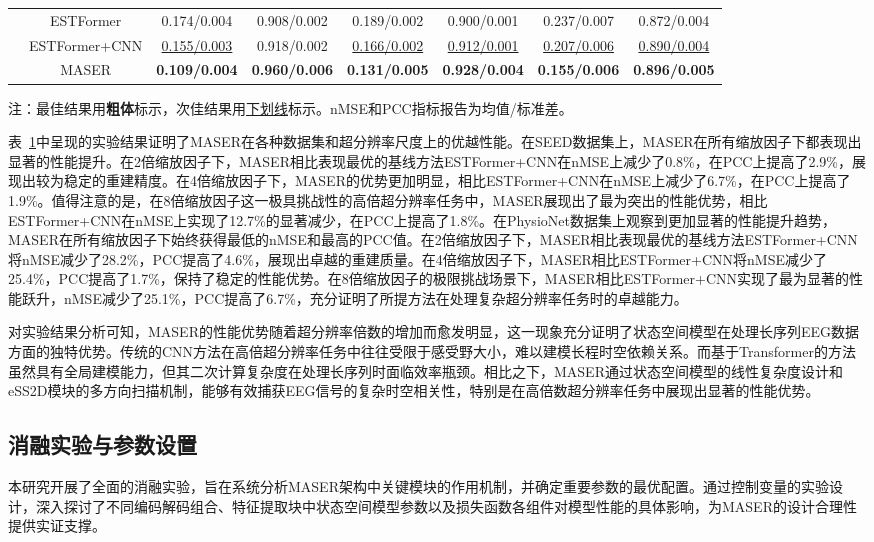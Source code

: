\begin{table}[htbp]
{\begin{tabular}{cccccccc}
 & ESTFormer \cite{li2023estformer} & 0.174/0.004 & 0.908/0.002 & 0.189/0.002 & 0.900/0.001 & 0.237/0.007 & 0.872/0.004 \\
 & ESTFormer+CNN \cite{li2023estformer} & \uline{0.155/0.003} & 0.918/0.002 & \uline{0.166/0.002} & \uline{0.912/0.001} & \uline{0.207/0.006} & \uline{0.890/0.004} \\
 & MASER & \textbf{0.109/0.004} & \textbf{0.960/0.006} & \textbf{0.131/0.005} & \textbf{0.928/0.004} & \textbf{0.155/0.006} & \textbf{0.896/0.005} \\
\bottomrule
\end{tabular}}
\begin{tablenotes}
\footnotesize
\item[]\centering 注：最佳结果用\textbf{粗体}标示，次佳结果用\underline{下划线}标示。nMSE和PCC指标报告为均值/标准差。
\end{tablenotes}
\label{TC3-1}
\end{table}

表~\ref{TC3-1}中呈现的实验结果证明了MASER在各种数据集和超分辨率尺度上的优越性能。在SEED数据集上，MASER在所有缩放因子下都表现出显著的性能提升。在2倍缩放因子下，MASER相比表现最优的基线方法ESTFormer+CNN在nMSE上减少了0.8\%，在PCC上提高了2.9\%，展现出较为稳定的重建精度。在4倍缩放因子下，MASER的优势更加明显，相比ESTFormer+CNN在nMSE上减少了6.7\%，在PCC上提高了1.9\%。值得注意的是，在8倍缩放因子这一极具挑战性的高倍超分辨率任务中，MASER展现出了最为突出的性能优势，相比ESTFormer+CNN在nMSE上实现了12.7\%的显著减少，在PCC上提高了1.8\%。在PhysioNet数据集上观察到更加显著的性能提升趋势，MASER在所有缩放因子下始终获得最低的nMSE和最高的PCC值。在2倍缩放因子下，MASER相比表现最优的基线方法ESTFormer+CNN将nMSE减少了28.2\%，PCC提高了4.6\%，展现出卓越的重建质量。在4倍缩放因子下，MASER相比ESTFormer+CNN将nMSE减少了25.4\%，PCC提高了1.7\%，保持了稳定的性能优势。在8倍缩放因子的极限挑战场景下，MASER相比ESTFormer+CNN实现了最为显著的性能跃升，nMSE减少了25.1\%，PCC提高了6.7\%，充分证明了所提方法在处理复杂超分辨率任务时的卓越能力。

对实验结果分析可知，MASER的性能优势随着超分辨率倍数的增加而愈发明显，这一现象充分证明了状态空间模型在处理长序列EEG数据方面的独特优势。传统的CNN方法在高倍超分辨率任务中往往受限于感受野大小，难以建模长程时空依赖关系。而基于Transformer的方法虽然具有全局建模能力，但其二次计算复杂度在处理长序列时面临效率瓶颈。相比之下，MASER通过状态空间模型的线性复杂度设计和eSS2D模块的多方向扫描机制，能够有效捕获EEG信号的复杂时空相关性，特别是在高倍数超分辨率任务中展现出显著的性能优势。

\subsection{消融实验与参数设置}
本研究开展了全面的消融实验，旨在系统分析MASER架构中关键模块的作用机制，并确定重要参数的最优配置。通过控制变量的实验设计，深入探讨了不同编码解码组合、特征提取块中状态空间模型参数以及损失函数各组件对模型性能的具体影响，为MASER的设计合理性提供实证支撑。


